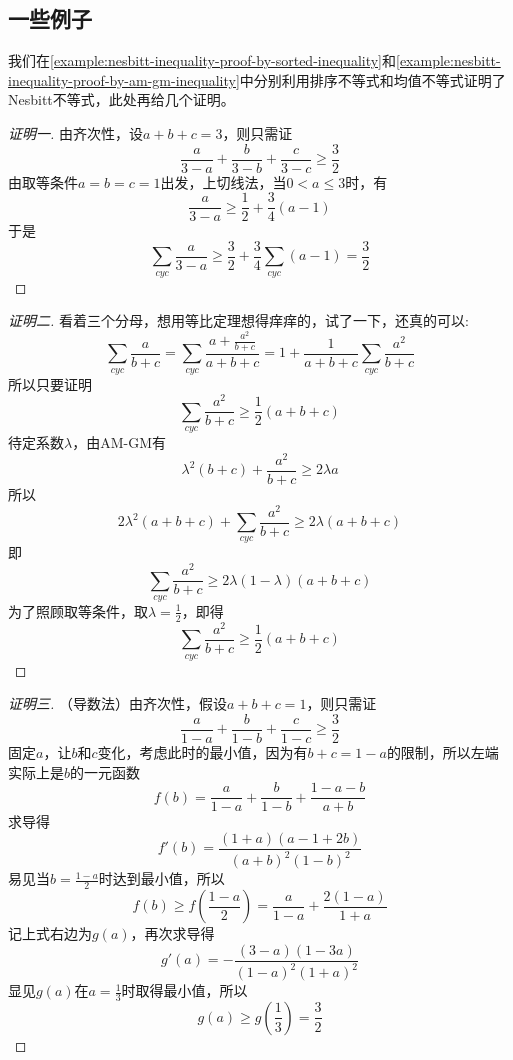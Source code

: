 \subsection{一些例子}
\label{sec:some-inequality-example}

\begin{example}[Nesbitt不等式的其它证法]
  我们在\autoref{example:nesbitt-inequality-proof-by-sorted-inequality}和\autoref{example:nesbitt-inequality-proof-by-am-gm-inequality}中分别利用排序不等式和均值不等式证明了Nesbitt不等式，此处再给几个证明。

  \begin{proof}[证明一]
    由齐次性，设$a+b+c=3$，则只需证
\[ \frac{a}{3-a}+\frac{b}{3-b}+\frac{c}{3-c} \geqslant \frac{3}{2} \]
由取等条件$a=b=c=1$出发，上切线法，当$0<a\leqslant 3$时，有
\[ \frac{a}{3-a} \geqslant \frac{1}{2}+\frac{3}{4}(a-1) \]
于是
\[ \sum_{cyc} \frac{a}{3-a} \geqslant \frac{3}{2} + \frac{3}{4}\sum_{cyc}(a-1) =\frac{3}{2} \]
  \end{proof}

  \begin{proof}[证明二]
 看着三个分母，想用等比定理想得痒痒的，试了一下，还真的可以:
\[ \sum_{cyc} \frac{a}{b+c}=\sum_{cyc}\frac{a+\frac{a^2}{b+c}}{a+b+c} = 1 + \frac{1}{a+b+c}\sum_{cyc}\frac{a^2}{b+c} \]
所以只要证明
\[ \sum_{cyc}\frac{a^2}{b+c} \geqslant \frac{1}{2}(a+b+c) \]
待定系数$\lambda$，由AM-GM有
\[ \lambda^2(b+c)+\frac{a^2}{b+c} \geqslant 2\lambda a \]
所以
\[ 2\lambda^2(a+b+c)+\sum_{cyc}\frac{a^2}{b+c} \geqslant 2\lambda (a+b+c) \]
即
\[ \sum_{cyc}\frac{a^2}{b+c} \geqslant 2\lambda(1-\lambda) (a+b+c) \]
为了照顾取等条件，取$\lambda=\frac{1}{2}$，即得
\[ \sum_{cyc}\frac{a^2}{b+c} \geqslant \frac{1}{2}(a+b+c) \]   
  \end{proof}

  \begin{proof}[证明三]
    （导数法）由齐次性，假设$a+b+c=1$，则只需证
\[ \frac{a}{1-a}+ \frac{b}{1-b} + \frac{c}{1-c} \geqslant \frac{3}{2} \]
固定$a$，让$b$和$c$变化，考虑此时的最小值，因为有$b+c=1-a$的限制，所以左端实际上是$b$的一元函数
\[ f(b)= \frac{a}{1-a}+ \frac{b}{1-b} + \frac{1-a-b}{a+b} \]
求导得
\[ f'(b)=\frac{(1+a)(a-1+2b)}{(a+b)^2(1-b)^2} \]
易见当$b=\frac{1-a}{2}$时达到最小值，所以
\[ f(b) \geqslant f \left( \frac{1-a}{2} \right) = \frac{a}{1-a} + \frac{2(1-a)}{1+a} \]
记上式右边为$g(a)$，再次求导得
\[ g'(a)=-\frac{(3-a)(1-3a)}{(1-a)^2(1+a)^2} \]
显见$g(a)$在$a=\frac{1}{3}$时取得最小值，所以
\[ g(a) \geqslant g \left( \frac{1}{3} \right) = \frac{3}{2} \]
  \end{proof}
\end{example}

